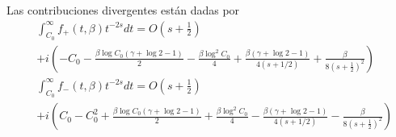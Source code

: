 Las contribuciones divergentes están dadas por
\begin{align}
\label{arriba}
&
	\int _{C _0} ^{\infty}
			f _{+} (t, \beta )			
			 t ^{-2s} dt =  
	O \left( s + \frac{1}{2} \right)
\\[5pt]
\nonumber			
&+
	i \left(- C _0 
		    - \frac{\beta \log C_0 (\gamma + \log 2 - 1 ) 
		    		}{2} 
		    - \frac{\beta \log ^2 C _0}{4}
		    + \frac{\beta ( \gamma + \log 2 -1 )}{4 (s + 1/2)} 
		    + \frac{\beta}{8 (s + \frac{1}{2}) ^2}
					\right)
\\[5pt]
\label{abajo}
&
	\int _{C _0} ^{\infty}
			f _{-} ( t, \beta)
			 t ^{-2s} dt =
	O \left(s + \frac{1}{2} \right)
\\[5pt]
\nonumber
&+
	i \left(C _0 
			- C _0 ^2
		    + \frac{\beta \log C_0 (\gamma + \log 2 - 1 ) 
		    		}{2} 
		    + \frac{\beta \log ^2 C _0}{4}
		    - \frac{\beta ( \gamma + \log 2 -1 )}{4 (s + 1/2)} 
		    - \frac{\beta}{8 (s + \frac{1}{2}) ^2}
					\right)
\end{align}
\begin{comment}
\begin{align}
\nonumber
&
	\int _{C _0} ^{\infty}
			f _{+} (t, \beta )			
			 t ^{-2s} dt =  
				i \left(
						\frac{C _0 ^{-2s}}{2s} +
						\frac{ \beta C _0 ^{-2s-1}}
							 {4} \left(
										\frac{\gamma  + \log 2 C_0 -1}
										{s + 1/2}
										+ \frac{1}{2 (s + 1/2) ^2}
										\right)
						\right)
\\[5pt]
\nonumber			
&=
	i \left(- C _0 
		    - \frac{\beta ( 2 \gamma + \log 4 C _0 -2 ) \log C_0
		    		}{4} 
		    + \frac{\beta ( \gamma + \log 2 -1 )}{4 (s + 1/2)} 
		    + \frac{\beta}{8 (s + \frac{1}{2}) ^2}
					\right)
\\
&
	+ O \left( s + \frac{1}{2} \right)
\\[5pt]
\nonumber
&
	\int _{C _0} ^{\infty}
			f _{-} ( t, \beta)
			 t ^{-2s} dt  \\
& 
=
\nonumber
				i \left(
						\frac{C _0 ^{-2s+1} }{s - \frac{1}{2}}
						- \frac{C _0 ^{-2s}}{2s} 
						- \frac{ \beta C _0 ^{-2s-1}}
							 {4} \left(
										\frac{\gamma  + \log 2 C_0 -1}
										{s + 1/2}
										+ \frac{1}{2 (s + 1/2) ^2}
										\right)
						\right)
\\[5pt]
\nonumber
&=
	i \left(
			- C _0 ^2 
			+ C _0 
		    + \frac{\beta ( 2 \gamma + \log 4 C _0 -2 ) \log C_0
		    		}{4} 
		    - \frac{\beta ( \gamma + \log 2 -1 )}{4 (s + 1/2)} 
		    - \frac{\beta}{8 (s + \frac{1}{2}) ^2}
					\right)
\\
	& + O \left(s + \frac{1}{2} \right)
\end{align}
\end{comment}
